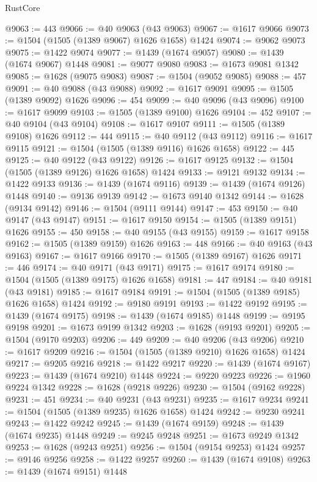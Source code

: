 \begin{lexlean}{RustCore}
\begin{coremodule}
@9063 := 443
@9066 := @40 @9063 (@43 @9063)
@9067 := @1617 @9066
@9073 := @1504 (@1505 (@1389 @9067) @1626 @1658) @1424
@9074 := @9062 @9073
@9075 := @1422 @9074
@9077 := @1439 (@1674 @9057)
@9080 := @1439 (@1674 @9067) @1448
@9081 := @9077 @9080
@9083 := @1673 @9081 @1342
@9085 := @1628 (@9075 @9083)
@9087 := @1504 (@9052 @9085)
@9088 := 457
@9091 := @40 @9088 (@43 @9088)
@9092 := @1617 @9091
@9095 := @1505 (@1389 @9092) @1626
@9096 := 454
@9099 := @40 @9096 (@43 @9096)
@9100 := @1617 @9099
@9103 := @1505 (@1389 @9100) @1626
@9104 := 452
@9107 := @40 @9104 (@43 @9104)
@9108 := @1617 @9107
@9111 := @1505 (@1389 @9108) @1626
@9112 := 444
@9115 := @40 @9112 (@43 @9112)
@9116 := @1617 @9115
@9121 := @1504 (@1505 (@1389 @9116) @1626 @1658)
@9122 := 445
@9125 := @40 @9122 (@43 @9122)
@9126 := @1617 @9125
@9132 := @1504 (@1505 (@1389 @9126) @1626 @1658) @1424
@9133 := @9121 @9132
@9134 := @1422 @9133
@9136 := @1439 (@1674 @9116)
@9139 := @1439 (@1674 @9126) @1448
@9140 := @9136 @9139
@9142 := @1673 @9140 @1342
@9144 := @1628 (@9134 @9142)
@9146 := @1504 (@9111 @9144)
@9147 := 453
@9150 := @40 @9147 (@43 @9147)
@9151 := @1617 @9150
@9154 := @1505 (@1389 @9151) @1626
@9155 := 450
@9158 := @40 @9155 (@43 @9155)
@9159 := @1617 @9158
@9162 := @1505 (@1389 @9159) @1626
@9163 := 448
@9166 := @40 @9163 (@43 @9163)
@9167 := @1617 @9166
@9170 := @1505 (@1389 @9167) @1626
@9171 := 446
@9174 := @40 @9171 (@43 @9171)
@9175 := @1617 @9174
@9180 := @1504 (@1505 (@1389 @9175) @1626 @1658)
@9181 := 447
@9184 := @40 @9181 (@43 @9181)
@9185 := @1617 @9184
@9191 := @1504 (@1505 (@1389 @9185) @1626 @1658) @1424
@9192 := @9180 @9191
@9193 := @1422 @9192
@9195 := @1439 (@1674 @9175)
@9198 := @1439 (@1674 @9185) @1448
@9199 := @9195 @9198
@9201 := @1673 @9199 @1342
@9203 := @1628 (@9193 @9201)
@9205 := @1504 (@9170 @9203)
@9206 := 449
@9209 := @40 @9206 (@43 @9206)
@9210 := @1617 @9209
@9216 := @1504 (@1505 (@1389 @9210) @1626 @1658) @1424
@9217 := @9205 @9216
@9218 := @1422 @9217
@9220 := @1439 (@1674 @9167)
@9223 := @1439 (@1674 @9210) @1448
@9224 := @9220 @9223
@9226 := @1960 @9224 @1342
@9228 := @1628 (@9218 @9226)
@9230 := @1504 (@9162 @9228)
@9231 := 451
@9234 := @40 @9231 (@43 @9231)
@9235 := @1617 @9234
@9241 := @1504 (@1505 (@1389 @9235) @1626 @1658) @1424
@9242 := @9230 @9241
@9243 := @1422 @9242
@9245 := @1439 (@1674 @9159)
@9248 := @1439 (@1674 @9235) @1448
@9249 := @9245 @9248
@9251 := @1673 @9249 @1342
@9253 := @1628 (@9243 @9251)
@9256 := @1504 (@9154 @9253) @1424
@9257 := @9146 @9256
@9258 := @1422 @9257
@9260 := @1439 (@1674 @9108)
@9263 := @1439 (@1674 @9151) @1448

\end{coremodule}
\end{lexlean}
